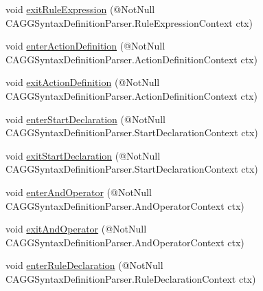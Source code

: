 \begin{DoxyCompactItemize}
\item 
void \hyperlink{classit_1_1emarolab_1_1cagg_1_1core_1_1language_1_1parser_1_1ANTLRInterface_1_1ANTLRGenerated_1_1a45b55289931e185944c10a916c8cdd_a867a6966f4bf1bb29c8e03573dd2c00a}{exit\-Rule\-Expression} (@Not\-Null C\-A\-G\-G\-Syntax\-Definition\-Parser.\-Rule\-Expression\-Context ctx)
\item 
void \hyperlink{classit_1_1emarolab_1_1cagg_1_1core_1_1language_1_1parser_1_1ANTLRInterface_1_1ANTLRGenerated_1_1a45b55289931e185944c10a916c8cdd_a256f02b07a671fdd81d7701bcd823e2e}{enter\-Action\-Definition} (@Not\-Null C\-A\-G\-G\-Syntax\-Definition\-Parser.\-Action\-Definition\-Context ctx)
\item 
void \hyperlink{classit_1_1emarolab_1_1cagg_1_1core_1_1language_1_1parser_1_1ANTLRInterface_1_1ANTLRGenerated_1_1a45b55289931e185944c10a916c8cdd_a90319430bb76b1134dfee6fcca9f7cb7}{exit\-Action\-Definition} (@Not\-Null C\-A\-G\-G\-Syntax\-Definition\-Parser.\-Action\-Definition\-Context ctx)
\item 
void \hyperlink{classit_1_1emarolab_1_1cagg_1_1core_1_1language_1_1parser_1_1ANTLRInterface_1_1ANTLRGenerated_1_1a45b55289931e185944c10a916c8cdd_aecab2e2e424f390a005d08f3f08019c9}{enter\-Start\-Declaration} (@Not\-Null C\-A\-G\-G\-Syntax\-Definition\-Parser.\-Start\-Declaration\-Context ctx)
\item 
void \hyperlink{classit_1_1emarolab_1_1cagg_1_1core_1_1language_1_1parser_1_1ANTLRInterface_1_1ANTLRGenerated_1_1a45b55289931e185944c10a916c8cdd_ada33ef3f8955175b180ca9e9c070af13}{exit\-Start\-Declaration} (@Not\-Null C\-A\-G\-G\-Syntax\-Definition\-Parser.\-Start\-Declaration\-Context ctx)
\item 
void \hyperlink{classit_1_1emarolab_1_1cagg_1_1core_1_1language_1_1parser_1_1ANTLRInterface_1_1ANTLRGenerated_1_1a45b55289931e185944c10a916c8cdd_a8bdd7eab663576066c38eb92a9797e90}{enter\-And\-Operator} (@Not\-Null C\-A\-G\-G\-Syntax\-Definition\-Parser.\-And\-Operator\-Context ctx)
\item 
void \hyperlink{classit_1_1emarolab_1_1cagg_1_1core_1_1language_1_1parser_1_1ANTLRInterface_1_1ANTLRGenerated_1_1a45b55289931e185944c10a916c8cdd_a1963fba040443a83c0fc3b97f2598889}{exit\-And\-Operator} (@Not\-Null C\-A\-G\-G\-Syntax\-Definition\-Parser.\-And\-Operator\-Context ctx)
\item 
void \hyperlink{classit_1_1emarolab_1_1cagg_1_1core_1_1language_1_1parser_1_1ANTLRInterface_1_1ANTLRGenerated_1_1a45b55289931e185944c10a916c8cdd_ad96d942e8588bf1d3b97db4489b77b1d}{enter\-Rule\-Declaration} (@Not\-Null C\-A\-G\-G\-Syntax\-Definition\-Parser.\-Rule\-Declaration\-Context ctx)

\end{DoxyCompactItemize}
